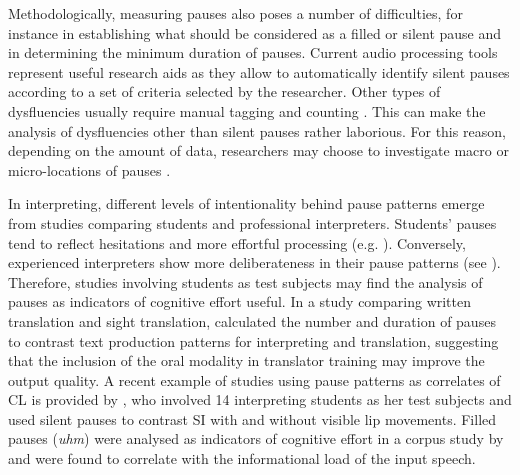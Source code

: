 Methodologically, measuring pauses also poses a number of difficulties, for instance in establishing what should be considered as a filled or silent pause and in determining the minimum duration of pauses. Current audio processing tools represent useful research aids as they allow to automatically identify silent pauses according to a set of criteria selected by the researcher. Other types of dysfluencies usually require manual tagging and counting \citep[185]{gieshoff_impact_2021}. This can make the analysis of dysfluencies other than silent pauses rather laborious. For this reason, depending on the amount of data, researchers may choose to investigate macro or micro-locations of pauses \citep{dragsted_comprehension_2008}.

In interpreting, different levels of intentionality behind pause patterns emerge from studies comparing students and professional interpreters. Students' pauses tend to reflect hesitations and more effortful processing (e.g. \citealt{tissi_silent_2001,mead_exploring_2002,mead_methodological_2005}). Conversely, experienced interpreters show more deliberateness in their pause patterns (see \citealt{cecot_pauses_2001,ahrens_prosodic_2005,ahrens_pauses_2007}). Therefore, studies involving students as test subjects may find the analysis of pauses as indicators of cognitive effort useful. In a study comparing written translation and sight translation, \citet{dragsted_exploring_2009} calculated the number and duration of pauses to contrast text production patterns for interpreting and translation, suggesting that the inclusion of the oral modality in translator training may improve the output quality. A recent example of studies using pause patterns as correlates of CL is provided by \citet{gieshoff_impact_2018,gieshoff_impact_2021}, who involved 14 interpreting students as her test subjects and used silent pauses to contrast SI with and without visible lip movements. Filled pauses (\textit{uhm}) were analysed as indicators of cognitive effort in a corpus study by \citet{plevoets_effect_2016,plevoets2018cognitive} and were found to correlate with the informational load of the input speech.

